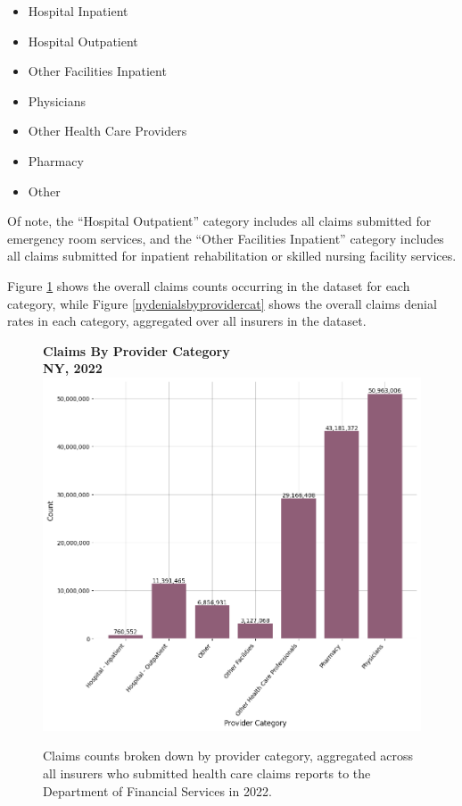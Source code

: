 \documentclass[12pt, a4paper,twoside,parskip=full]{report}
\theoremstyle{plain} %
\theoremstyle{definition} %
\theoremstyle{remark} %
\numberwithin{equation}{chapter}
\begin{document}
		\begin{itemize}
			\item Hospital Inpatient
			\item Hospital Outpatient
			\item Other Facilities Inpatient
			\item Physicians
			\item Other Health Care Providers
			\item Pharmacy
			\item Other
		\end{itemize}
	
		Of note, the ``Hospital Outpatient'' category includes all claims submitted for emergency room services, and the ``Other Facilities Inpatient'' category includes all claims submitted for inpatient rehabilitation or skilled nursing facility services.
		
		Figure \ref{nyclaimsbyprovidercat} shows the overall claims counts occurring in the dataset for each category, while Figure \ref{nydenialsbyprovidercat} shows the overall claims denial rates in each category, aggregated over all insurers in the dataset.
		
		
		\begin{figure}[h!]
			\centering
			\textbf{Claims By Provider Category}\\
			\textbf{NY, 2022}\\
			\includegraphics[width=\columnwidth]{images/ny_claim_reports/claims_by_provider_cat.png}
			\caption{ Claims counts broken down by provider category, aggregated across all insurers who submitted health care claims reports to the Department of Financial Services in 2022.}
			\label{nyclaimsbyprovidercat}
		\end{figure}
	
\end{document}
